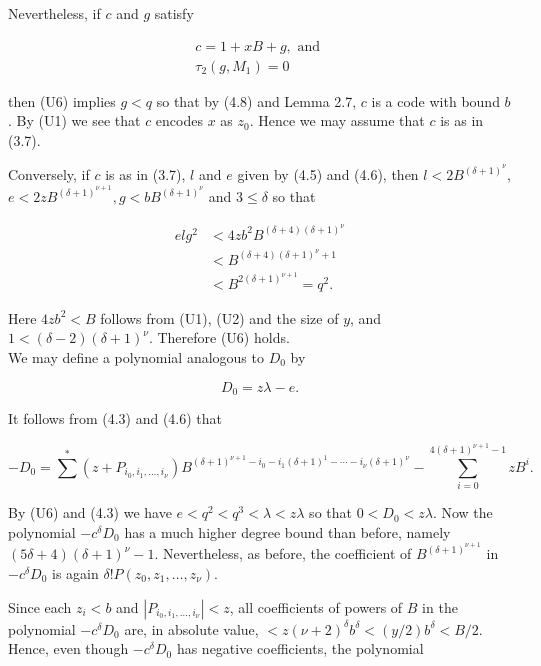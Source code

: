 \documentclass[11pt,a4paper]{article}
\newcommand{\origpage}[1]{\marginnote{\footnotesize\textbf{[#1]}}}
\begin{document}
Nevertheless, if $c$ and $g$ satisfy


\begin{gather*}
c=1+x B+g, \text { and }  \tag{U10}\\
\tau_{2}\left(g, M_{1}\right)=0 \tag{4.8}
\end{gather*}


then (U6) implies $g<q$ so that by (4.8) and Lemma 2.7, $c$ is a code with bound $b$. By (U1) we see that $c$ encodes $x$ as $z_{0}$. Hence we may assume that $c$ is as in (3.7).

Conversely, if $c$ is as in (3.7), $l$ and $e$ given by (4.5) and (4.6), then $l<2 B^{(\delta+1)^{\nu}}$, $e<2 z B^{(\delta+1)^{\nu+1}},\allowbreak  g<b B^{(\delta+1)^{\nu}}$ and $3 \leq \delta$ so that

\[
\begin{aligned} e l g^{2}&<4zb^{2}B^{(\delta+4)(\delta+1)^\nu}\\ &<B^{(\delta+4)(\delta+1)^\nu+1}\\ &<B^{2(\delta+1)^{\nu+1}}=q^{2}. \end{aligned}
\]

Here $4zb^2<B$ follows from (U1), (U2) and the size of $y$, and $1<(\delta-2)(\delta+1)^\nu$. Therefore (U6) holds.\\
We may define a polynomial analogous to $D_{0}$ by


\begin{equation*}
D_{0}=z \lambda-e . \tag{U11}
\end{equation*}


\origpage{566}It follows from (4.3) and (4.6) that

\[
-D_{0}=\sum^{*}\left(z+P_{i_{0}, i_{1}, \ldots, i_{\nu}}\right) B^{(\delta+1)^{\nu+1}-i_{0}-i_{1}(\delta+1)^{1}-\cdots-i_{\nu}(\delta+1)^{\nu}}-\sum_{i=0}^{4(\delta+1)^{\nu+1}-1} z B^{i} .
\]

By (U6) and (4.3) we have $e<q^{2}<q^{3}<\lambda<z \lambda$ so that $0<D_{0}<z \lambda$. Now the polynomial $-c^{\delta} D_{0}$ has a much higher degree bound than before, namely $(5\delta+4)(\delta+1)^\nu-1$. Nevertheless, as before, the coefficient of $B^{(\delta+1)^{\nu+1}}$ in $-c^{\delta} D_{0}$ is again $\delta!P\left(z_{0},\allowbreak  z_{1},\allowbreak  \ldots,\allowbreak  z_{\nu}\right)$.

Since each $z_{i}<b$ and $\left|P_{i_{0}, i_{1}, \ldots, i_{\nu}}\right|<z$, all coefficients of powers of $B$ in the polynomial $-c^{\delta} D_{0}$ are, in absolute value, $<z(\nu+2)^{\delta} b^{\delta}<(y / 2) b^{\delta}<B / 2$. Hence, even though $-c^{\delta} D_{0}$ has negative coefficients, the polynomial
\end{document}

